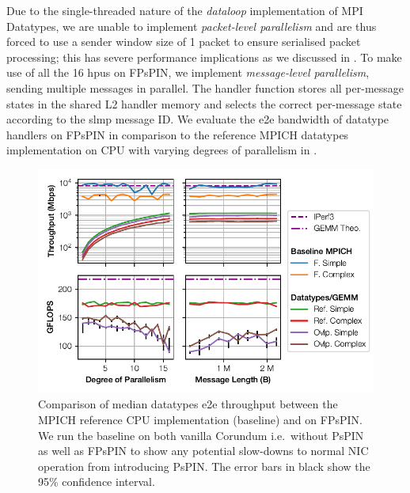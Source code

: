 Due to the single-threaded nature of the \emph{dataloop} implementation of MPI Datatypes, we are unable to implement \emph{packet-level parallelism} and are thus forced to use a sender window size of 1 packet to ensure serialised packet processing; this has severe performance implications as we discussed in .  To make use of all the 16 \ac{hpu}s on FPsPIN, we implement \emph{message-level parallelism}, sending multiple messages in parallel.  The handler function stores all per-message states in the shared L2 handler memory and selects the correct per-message state according to the \ac{slmp} message ID.  We evaluate the \ac{e2e} bandwidth of datatype handlers on FPsPIN in comparison to the reference MPICH datatypes implementation on CPU with varying degrees of parallelism in .

\begin{figure}[tp]
    \centering
    \includegraphics{thesis/figures/datatypes-tput.pdf}
    \caption{Comparison of median datatypes \ac{e2e} throughput between the MPICH reference CPU implementation (baseline) and on FPsPIN.  We run the baseline on both vanilla Corundum i.e.\ without PsPIN as well as FPsPIN to show any potential slow-downs to normal NIC operation from introducing PsPIN.  The error bars in black show the 95\% confidence interval.} \label{fig:datatypes-tput}
\end{figure}

